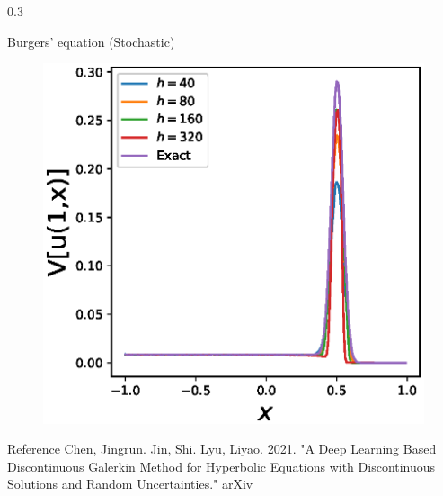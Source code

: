 \documentclass{msuposter}
\newcommand{\colwidth}{0.3\linewidth}
\begin{document}
\begin{frame}{}
\begin{columns}[t]
\begin{column}{\colwidth}
\begin{exampleblock}{Burgers' equation (Stochastic)}
\begin{figure}
\includegraphics[width = 0.8\linewidth]{Burgus_equation_storchstic_dim_s_10_eps_005_V}
\end{figure}
\end{exampleblock}
\begin{block}{Reference}
Chen, Jingrun. Jin, Shi. Lyu, Liyao. 2021. "A Deep Learning Based Discontinuous Galerkin Method for Hyperbolic Equations with Discontinuous Solutions and Random Uncertainties."  arXiv 
\end{block}
\end{column}
\end{columns}	
\end{frame}
\end{document}
